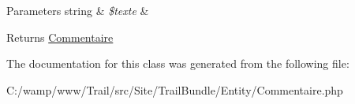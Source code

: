 \begin{DoxyParams}[1]{Parameters}
string & {\em \$texte} & \\
\hline
\end{DoxyParams}
\begin{DoxyReturn}{Returns}
\hyperlink{class_site_1_1_trail_bundle_1_1_entity_1_1_commentaire}{Commentaire} 
\end{DoxyReturn}


The documentation for this class was generated from the following file\+:\begin{DoxyCompactItemize}
\item 
C\+:/wamp/www/\+Trail/src/\+Site/\+Trail\+Bundle/\+Entity/Commentaire.\+php\end{DoxyCompactItemize}
